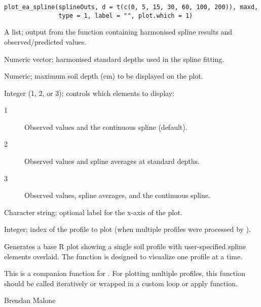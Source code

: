\documentclass[a4paper]{book}
\begin{document}
%
\begin{Usage}
\begin{verbatim}
plot_ea_spline(splineOuts, d = t(c(0, 5, 15, 30, 60, 100, 200)), maxd, 
               type = 1, label = "", plot.which = 1)
\end{verbatim}
\end{Usage}
%
\begin{Arguments}
\begin{ldescription}
\item[\code{splineOuts}] A list; output from the  function containing harmonised spline results and observed/predicted values.
\item[\code{d}] Numeric vector; harmonised standard depths used in the spline fitting.
\item[\code{maxd}] Numeric; maximum soil depth (cm) to be displayed on the plot.
\item[\code{type}] Integer (1, 2, or 3); controls which elements to display:
\begin{description}

\item[1] Observed values and the continuous spline (default).
\item[2] Observed values and spline averages at standard depths.
\item[3] Observed values, spline averages, and the continuous spline.

\end{description}


\item[\code{label}] Character string; optional label for the x-axis of the plot.
\item[\code{plot.which}] Integer; index of the profile to plot (when multiple profiles were processed by ).
\end{ldescription}
\end{Arguments}
%
\begin{Value}
Generates a base R plot showing a single soil profile with user-specified spline elements overlaid. The function is designed to visualize one profile at a time.
\end{Value}
%
\begin{Note}
This is a companion function for . For plotting multiple profiles, this function should be called iteratively or wrapped in a custom loop or apply function.
\end{Note}
%
\begin{Author}
Brendan Malone
\end{Author}
\end{document}
